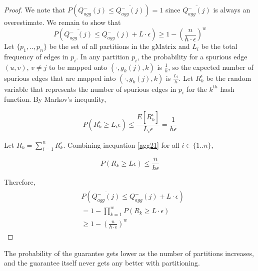 \begin{proof}
We note that $P(Q_{agg}^{-}(j) \leq \overline{Q_{agg}^{-}(j)}) = 1$ since $\overline{Q_{agg}^{-}(j)}$ is always an overestimate. We remain to show that
\[
P(\overline{Q_{agg}^{-}(j)} \leq Q_{agg}^{-}(j) + L \cdot \epsilon) \geq 1-(\frac{n}{h\cdot\epsilon})^w
\]
Let $\{p_1,..,p_n\}$ be the set of all partitions in the gMatrix and $L_i$ be the total frequency of edges in $p_i$. In any partition $p_i$, the probability for a spurious edge $(u,v)$, $v \neq j$ to be mapped onto $(\cdot,g_k(j),k)$ is $\frac{1}{h}$, so the expected number of spurious edges that are mapped into $(\cdot,g_k(j),k)$ is $\frac{L_i}{h}$. Let $R_k^i$ be the random variable that represents the number of spurious edges in $p_i$ for the $k^{th}$ hash function. By Markov's inequality,

\begin{equation} \label{agg21}
  P(R_k^i \geq L_i \epsilon) \leq \frac{E[R_k^i]}{L_i \epsilon} = \frac{1}{h\epsilon}
\end{equation}

Let $R_k = \sum_{i=1}^{n} R_k^i$. Combining inequation \ref{agg21} for all $i \in \{1..n\}$, 

\begin{equation} \label{agg22}
 P(R_k \geq L\epsilon) \leq \frac{n}{h\epsilon}
\end{equation}

Therefore,
\begin{align}
\begin{split}
&  P(\overline{Q_{agg}^{-}(j)} \leq Q_{agg}^{-}(j) + L \cdot \epsilon)
\\  &= 1 - \prod _{k=1}^{w}P(R_k \geq L \cdot \epsilon)
\\  &\geq 1-(\frac{n}{h\cdot\epsilon})^w
\end{split}
\end{align}

\end{proof}

\begin{remarks}
The probability of the guarantee gets lower as the number of partitions increases, and the guarantee itself never gets any better with partitioning.
\end{remarks}
